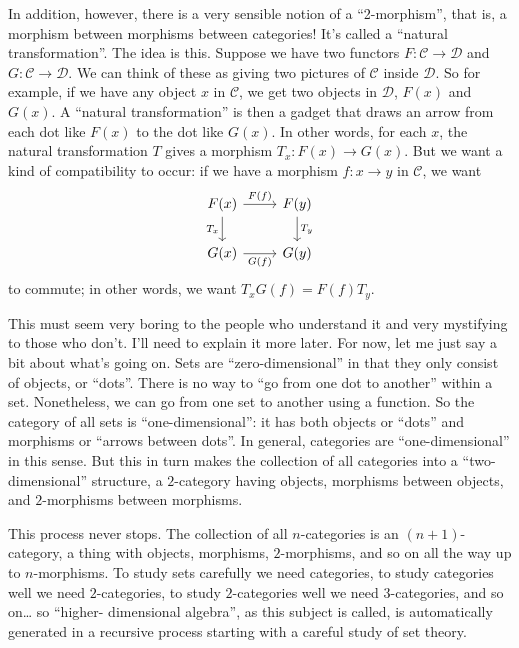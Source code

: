 \documentclass{article}
\begin{document}
In addition, however, there is a very sensible notion of a
``2-morphism'', that is, a morphism between morphisms between
categories! It's called a ``natural transformation''. The idea is this.
Suppose we have two functors \(F\colon \mathcal{C} \to \mathcal{D}\) and
\(G\colon \mathcal{C} \to \mathcal{D}\). We can think of these as giving
two pictures of \(\mathcal{C}\) inside \(\mathcal{D}\). So for example,
if we have any object \(x\) in \(\mathcal{C}\), we get two objects in
\(\mathcal{D}\), \(F(x)\) and \(G(x)\). A ``natural transformation'' is
then a gadget that draws an arrow from each dot like \(F(x)\) to the dot
like \(G(x)\). In other words, for each \(x\), the natural
transformation \(T\) gives a morphism \(T_x\colon F(x) \to G(x)\). But
we want a kind of compatibility to occur: if we have a morphism
\(f\colon x \to y\) in \(\mathcal{C}\), we want \[
  \begin{tikzcd}
    F(x) \rar["F(f)"] \dar[swap,"T_x"]
    & F(y) \dar["T_y"]
  \\G(x) \rar[swap,"G(f)"]
    & G(y)
  \end{tikzcd}
\] to commute; in other words, we want \(T_x G(f) = F(f) T_y\).

This must seem very boring to the people who understand it and very
mystifying to those who don't. I'll need to explain it more later. For
now, let me just say a bit about what's going on. Sets are
``zero-dimensional'' in that they only consist of objects, or ``dots''.
There is no way to ``go from one dot to another'' within a set.
Nonetheless, we can go from one set to another using a function. So the
category of all sets is ``one-dimensional'': it has both objects or
``dots'' and morphisms or ``arrows between dots''. In general,
categories are ``one-dimensional'' in this sense. But this in turn makes
the collection of all categories into a ``two-dimensional'' structure, a
\(2\)-category having objects, morphisms between objects, and
\(2\)-morphisms between morphisms.

This process never stops. The collection of all \(n\)-categories is an
\((n+1)\)-category, a thing with objects, morphisms, \(2\)-morphisms,
and so on all the way up to \(n\)-morphisms. To study sets carefully we
need categories, to study categories well we need \(2\)-categories, to
study \(2\)-categories well we need \(3\)-categories, and so on\ldots{}
so ``higher- dimensional algebra'', as this subject is called, is
automatically generated in a recursive process starting with a careful
study of set theory.
\end{document}
